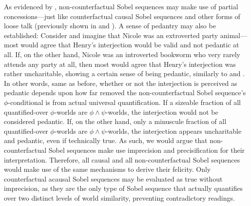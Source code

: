 As evidenced by , non-counterfactual Sobel sequences may make use of partial concessions---just like counterfactual causal Sobel sequences and other forms of loose talk (previously shown in  and ). A sense of pedantry may also be established: Consider  and imagine that Nicole was an extroverted party animal---most would agree that Henry's interjection would be valid and not pedantic at all. If, on the other hand, Nicole was an introverted bookworm who very rarely attends any party at all, then most would agree that Henry's interjection was rather uncharitable, showing a certain sense of being pedantic, similarly to  and . In other words, same as before, whether or not the interjection is perceived as pedantic depends upon how far removed the non-counterfactual Sobel sequence's $\phi$-conditional is from actual universal quantification. If a sizeable fraction of all quantified-over $\phi$-worlds are $\phi\land\psi$-worlds, the interjection would not be considered pedantic. If, on the other hand, only a minuscule fraction of all quantified-over $\phi$-worlds are $\phi\land\psi$-worlds, the interjection appears uncharitable and pedantic, even if technically true. As such, we would argue that non-counterfactual Sobel sequences make use imprecision and precisification for their interpretation. Therefore, all causal and all non-counterfactual Sobel sequences would make use of the same mechanisms to derive their felicity. Only counterfactual acausal Sobel sequences may be evaluated as true without imprecision, as they are the only type of Sobel sequence that actually quantifies over two distinct levels of world similarity, preventing contradictory readings.

